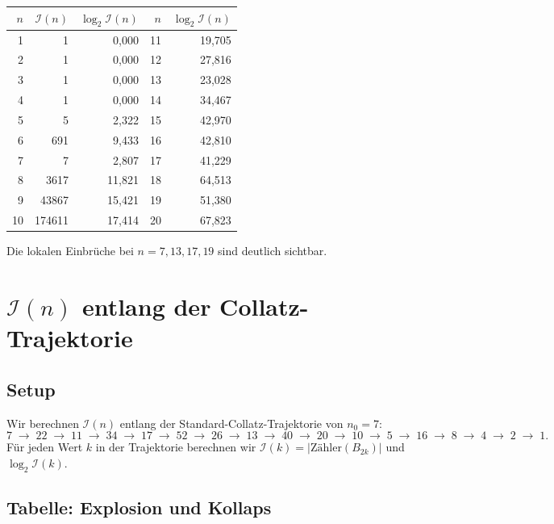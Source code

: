 \documentclass[12pt,a4paper]{article}
\newcommand{\abs}[1]{\lvert#1\rvert}
\newcommand{\In}{\mathcal{I}}      %
\begin{document}
\begin{center}
\renewcommand{\arraystretch}{1.25}
\begin{tabular}{rrrrr}
\toprule
$n$ & $\In(n)$ & $\log_2 \In(n)$ &
$n$ & $\log_2 \In(n)$ \\
\midrule
 1 & 1                    & 0{,}000  & 11 & 19{,}705 \\
 2 & 1                    & 0{,}000  & 12 & 27{,}816 \\
 3 & 1                    & 0{,}000  & 13 & 23{,}028 \\
 4 & 1                    & 0{,}000  & 14 & 34{,}467 \\
 5 & 5                    & 2{,}322  & 15 & 42{,}970 \\
 6 & 691                  & 9{,}433  & 16 & 42{,}810 \\
 7 & 7                    & 2{,}807  & 17 & 41{,}229 \\
 8 & 3617                 & 11{,}821 & 18 & 64{,}513 \\
 9 & 43867                & 15{,}421 & 19 & 51{,}380 \\
10 & 174611               & 17{,}414 & 20 & 67{,}823 \\
\bottomrule
\end{tabular}
\end{center}

Die lokalen Einbrüche bei $n = 7, 13, 17, 19$ sind deutlich sichtbar.

\section{\texorpdfstring{$\In(n)$}{I(n)} entlang der Collatz-Trajektorie}
\label{sec:trajektorie}

\subsection{Setup}

Wir berechnen $\In(n)$ entlang der Standard-Collatz-Trajektorie von $n_0 = 7$:
\[
  7 \;\to\; 22 \;\to\; 11 \;\to\; 34 \;\to\; 17 \;\to\;
  52 \;\to\; 26 \;\to\; 13 \;\to\; 40 \;\to\; 20 \;\to\;
  10 \;\to\; 5 \;\to\; 16 \;\to\; 8 \;\to\; 4 \;\to\; 2 \;\to\; 1.
\]
Für jeden Wert $k$ in der Trajektorie berechnen wir $\In(k) = \abs{\text{Zähler}(B_{2k})}$
und $\log_2 \In(k)$.

\subsection{Tabelle: Explosion und Kollaps}
\end{document}
